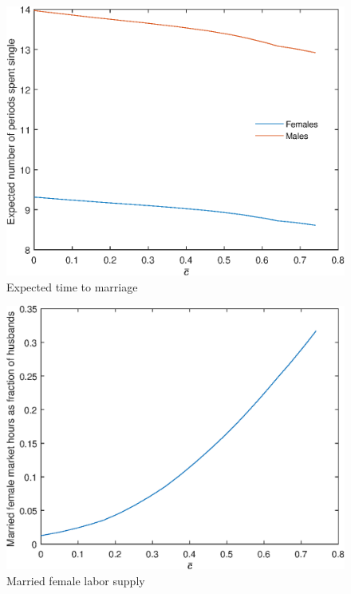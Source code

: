 \documentclass[12pt]{article}
\begin{document}
\begin{figure}
	\centering
	\caption{Expected time to marriage}
	\includegraphics{Graphs/exp_single_cbar_ex1.eps}
\end{figure}

\begin{figure}
	\centering
	\caption{Married female labor supply}
	\includegraphics{Graphs/lf_cbar_ex1.eps}
\end{figure}
\end{document}
